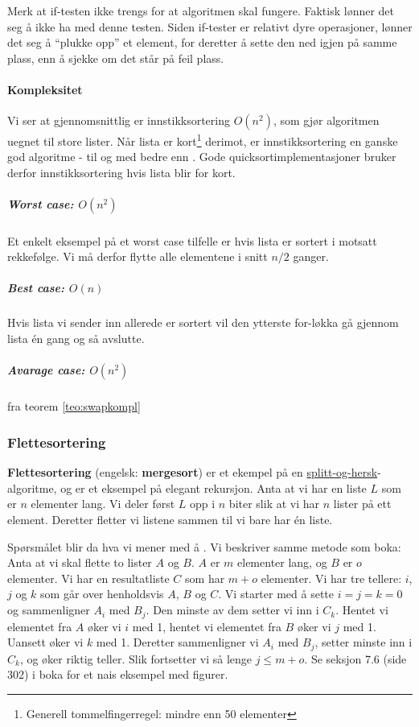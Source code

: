 
Merk at if-testen ikke trengs for at algoritmen skal fungere.
Faktisk lønner det seg å ikke ha med denne testen.
Siden if-tester er relativt dyre operasjoner, lønner det seg å ``plukke opp'' et
element, for deretter å sette den ned igjen på samme plass, enn å sjekke om det
står på feil plass.

\paragraph{Kompleksitet}
Vi ser at gjennomsnittlig er innstikksortering $ O(n^2) $, som gjør algoritmen uegnet til store lister. Når lista er kort\footnote{Generell tommelfingerregel: mindre enn 50 elementer} derimot, er innstikksortering en ganske god algoritme - til og med bedre enn . Gode quicksortimplementasjoner bruker derfor innstikksortering hvis lista blir for kort. 

\subparagraph{Worst case: $ O(n^2) $} Et enkelt eksempel på et worst case tilfelle er hvis lista er sortert i motsatt rekkefølge. Vi må derfor flytte alle elementene i snitt $ n/2 $ ganger.

\subparagraph{Best case: $ O(n) $} Hvis lista vi sender inn allerede er sortert vil den ytterste for-løkka gå gjennom lista én gang og så avslutte. 

\subparagraph{Avarage case: $ O(n^2) $} fra teorem \ref{teo:swapkompl}



\subsubsection{Flettesortering}\label{mergesort}
\textbf{Flettesortering} (engelsk: \textbf{mergesort}) er et ekempel på en \hyperref[splitthersk]{splitt-og-hersk}-algoritme, og er et eksempel på elegant rekursjon. Anta at vi har en liste $ L $ som er $ n $ elementer lang. Vi deler først $ L $ opp i $ n $ biter slik at vi har $ n $ lister på ett element. Deretter fletter vi listene sammen til vi bare har én liste. 

Spørsmålet blir da hva vi mener med å . Vi beskriver samme metode som boka: Anta at vi skal flette to lister $ A $ og $ B $. $ A $ er $ m $ elementer lang, og $ B $ er $ o $ elementer. Vi har en resultatliste $ C $ som har $ m+o $ elementer. Vi har tre tellere: $ i $, $ j $ og $ k $ som går over henholdsvis $ A $, $ B $ og $ C $. Vi starter med å sette $ i=j=k=0 $ og sammenligner $ A_i $ med $ B_j $. Den minste av dem setter vi inn i $ C_k $. Hentet vi elementet fra $ A $ øker vi $ i $ med 1, hentet vi elementet fra $ B $ øker vi $ j $ med 1. Uansett øker vi $ k $ med 1. Deretter sammenligner vi $ A_i $ med $ B_j $, setter minste inn i $ C_k $, og øker riktig teller. Slik fortsetter vi så lenge $ j \leq m+o $. Se seksjon 7.6 (side 302) i boka for et nais eksempel med figurer. 

